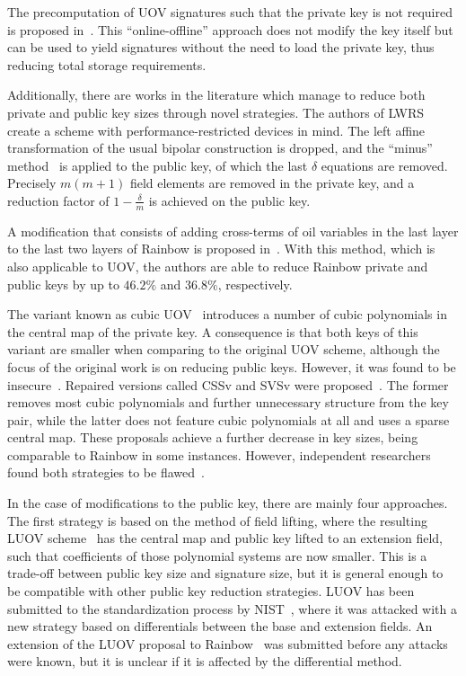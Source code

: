 \documentclass[draft, 12pt, a4paper, oneside]{memoir}
\begin{document}
The precomputation of UOV signatures such that the private key is not required is proposed in~\cite{}. This ``online-offline'' approach does not modify the key itself but can be used to yield signatures without the need to load the private key, thus reducing total storage requirements.

Additionally, there are works in the literature which manage to reduce both private and public key sizes through novel strategies. The authors of LWRS~\cite{} create a scheme with performance-restricted devices in mind. The left affine transformation of the usual bipolar construction is dropped, and the ``minus'' method~\cite[Subsection 3.2.1]{} is applied to the public key, of which the last $\delta$ equations are removed. Precisely $m (m + 1)$ field elements are removed in the private key, and a reduction factor of $1 - \frac{\delta}{m}$ is achieved on the public key.

A modification that consists of adding cross-terms of oil variables in the last layer to the last two layers of Rainbow is proposed in~\cite{}. With this method, which is also applicable to UOV, the authors are able to reduce Rainbow private and public keys by up to $46.2\%$ and $36.8\%$, respectively.

The variant known as cubic UOV~\cite{} introduces a number of cubic polynomials in the central map of the private key. A consequence is that both keys of this variant are smaller when comparing to the original UOV scheme, although the focus of the original work is on reducing public keys. However, it was found to be insecure~\cite{}. Repaired versions called CSSv and SVSv were proposed~\cite{}. The former removes most cubic polynomials and further unnecessary structure from the key pair, while the latter does not feature cubic polynomials at all and uses a sparse central map. These proposals achieve a further decrease in key sizes, being comparable to Rainbow in some instances. However, independent researchers found both strategies to be flawed~\cite{}.

In the case of modifications to the public key, there are mainly four approaches. The first strategy is based on the method of field lifting, where the resulting LUOV scheme~\cite{} has the central map and public key lifted to an extension field, such that coefficients of those polynomial systems are now smaller. This is a trade-off between public key size and signature size, but it is general enough to be compatible with other public key reduction strategies. LUOV has been submitted to the standardization process by NIST~\cite{}, where it was attacked with a new strategy based on differentials between the base and extension fields. An extension of the LUOV proposal to Rainbow~\cite{} was submitted before any attacks were known, but it is unclear if it is affected by the differential method.
\end{document}
